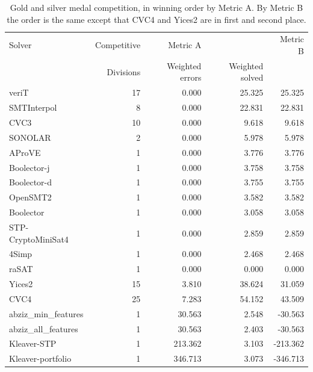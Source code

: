 \documentclass[twoside,11pt]{article}
\begin{document}
\begin{table}
\caption{Gold and silver medal competition, in winning order by Metric A. By Metric B the order is the same except that CVC4 and Yices2 are in first and second place.}
\label{Table:medals}
\centering
\begin{tabular}{|l|r|rr|r|}
\hline
Solver  & Competitive & Metric A & & Metric B \\
 & Divisions & Weighted errors & Weighted solved & \\
\hline
veriT & 17 &	0.000 	& 	25.325 & 25.325 \\
SMTInterpol & 8 &	0.000 	& 	22.831 & 22.831 \\
CVC3 & 10	& 	0.000 	& 	9.618 & 9.618 \\
SONOLAR 	& 2	&  	0.000 	& 	5.978 & 	5.978\\
AProVE 		& 1 & 	0.000 	& 	3.776	& 	3.776\\
Boolector-j & 1	&  	0.000 	& 	3.758	& 	3.758\\
Boolector-d & 1		&  	0.000 	& 	3.755 & 	3.755\\
OpenSMT2 	& 1	&  	0.000 &	3.582 &	3.582\\
Boolector & 1		&  	0.000 &	3.058  &	3.058 \\
STP-CryptoMiniSat4 	& 1	&  	0.000 &	2.859 &	2.859\\
4Simp 	& 1	& 	0.000 	& 	2.468  	& 	2.468 \\
raSAT 	& 1	& 	0.000 	& 	0.000 	& 	0.000 \\
Yices2 	& 15	&  	3.810 	& 	38.624 & 31.059 \\
CVC4 		& 25 &  	7.283 	& 	54.152 & 43.509 \\
abziz\_min\_features 	& 1	& 	30.563 	& 	2.548 & -30.563 \\
abziz\_all\_features 	& 1	&  	30.563 	& 	2.403 & -30.563 \\
Kleaver-STP 	& 1	&  	213.362 	& 	3.103 & -213.362 \\
Kleaver-portfolio & 1		&  	346.713 	& 	3.073  & -346.713 \\
\hline
\end{tabular}
\end{table}
\end{document}
